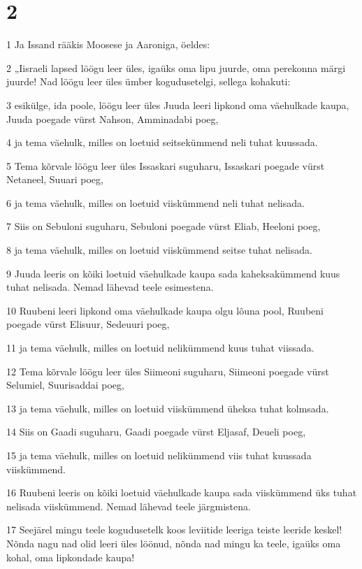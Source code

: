\chapter{2}

\par 1 Ja Issand rääkis Moosese ja Aaroniga, öeldes:
\par 2 „Iisraeli lapsed löögu leer üles, igaüks oma lipu juurde, oma perekonna märgi juurde! Nad löögu leer üles ümber kogudusetelgi, sellega kohakuti:
\par 3 esikülge, ida poole, löögu leer üles Juuda leeri lipkond oma väehulkade kaupa, Juuda poegade vürst Nahson, Amminadabi poeg,
\par 4 ja tema väehulk, milles on loetuid seitsekümmend neli tuhat kuussada.
\par 5 Tema kõrvale löögu leer üles Issaskari suguharu, Issaskari poegade vürst Netaneel, Suuari poeg,
\par 6 ja tema väehulk, milles on loetuid viiskümmend neli tuhat nelisada.
\par 7 Siis on Sebuloni suguharu, Sebuloni poegade vürst Eliab, Heeloni poeg,
\par 8 ja tema väehulk, milles on loetuid viiskümmend seitse tuhat nelisada.
\par 9 Juuda leeris on kõiki loetuid väehulkade kaupa sada kaheksakümmend kuus tuhat nelisada. Nemad lähevad teele esimestena.
\par 10 Ruubeni leeri lipkond oma väehulkade kaupa olgu lõuna pool, Ruubeni poegade vürst Elisuur, Sedeuuri poeg,
\par 11 ja tema väehulk, milles on loetuid nelikümmend kuus tuhat viissada.
\par 12 Tema kõrvale löögu leer üles Siimeoni suguharu, Siimeoni poegade vürst Selumiel, Suurisaddai poeg,
\par 13 ja tema väehulk, milles on loetuid viiskümmend üheksa tuhat kolmsada.
\par 14 Siis on Gaadi suguharu, Gaadi poegade vürst Eljasaf, Deueli poeg,
\par 15 ja tema väehulk, milles on loetuid nelikümmend viis tuhat kuussada viiskümmend.
\par 16 Ruubeni leeris on kõiki loetuid väehulkade kaupa sada viiskümmend üks tuhat nelisada viiskümmend. Nemad lähevad teele järgmistena.
\par 17 Seejärel mingu teele kogudusetelk koos leviitide leeriga teiste leeride keskel! Nõnda nagu nad olid leeri üles löönud, nõnda nad mingu ka teele, igaüks oma kohal, oma lipkondade kaupa!
